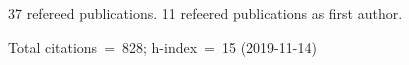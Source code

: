 37 refereed publications. 11 refeered publications as first author.

Total citations~=~828; h-index~=~15 (2019-11-14)